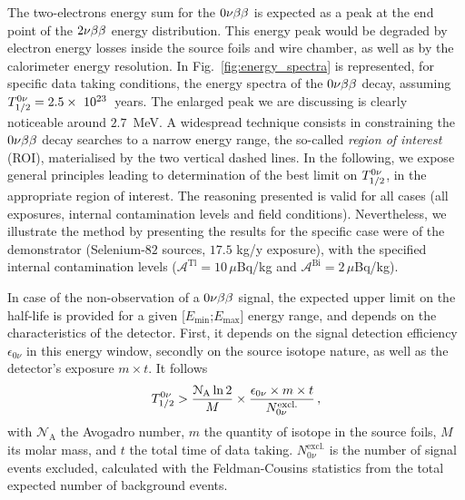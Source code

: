 The two-electrons energy sum for the $0\nu\beta\beta$ is expected as a peak at the end point of the $2\nu\beta\beta$ energy distribution.
This energy peak would be degraded by electron energy losses inside the source foils and wire chamber, as well as by the calorimeter energy resolution.
In Fig.~\ref{fig:energy_spectra} is represented, for specific data taking conditions, the energy spectra of the $0\nu\beta\beta$ decay, assuming $T_{1/2}^{0\nu} = 2.5\times~10^{23}$~years.
The enlarged peak we are discussing is clearly noticeable around $2.7$~MeV. %
A widespread technique consists in constraining the $0\nu\beta\beta$ decay searches to a narrow energy range, the so-called \emph{region of interest} (ROI), materialised by the two vertical dashed lines.
In the following, we expose general principles leading to determination of the best limit on $T_{1/2}^{0\nu}$, in the appropriate region of interest.
The reasoning presented is valid for all cases (all exposures, internal contamination levels and field conditions).
Nevertheless, we illustrate the method by presenting the results for the specific case were of the demonstrator (Selenium-$82$ sources, $17.5$ kg/y exposure), with the specified internal contamination levels ($\mathcal{A}^{\text{Tl}} = 10\,\mu$Bq/kg and $\mathcal{A}^{\text{Bi}} = 2\,\mu$Bq/kg).

In case of the non-observation of a $0\nu\beta\beta$ signal, the expected upper limit on the half-life is provided for a given [$E_{\text{min}}$;$E_{\text{max}}$] energy range, and depends on the characteristics of the detector.
First, it depends on the signal detection efficiency $\epsilon_{0\nu}$ in this energy window, secondly on the source isotope nature, as well as the detector's exposure $m\times t$.
It follows
\begin{equation}
  T_{1/2}^{0\nu} > \frac{\mathcal{N}_{\text{A}}\ln{2}}{M}\times \frac{\epsilon_{0\nu}\times m\times t}{N_{0\nu}^{\text{excl.}}}\,,
  \label{eq:tbeta_limit}
\end{equation}
with $\mathcal{N}_{\text{A}}$ the Avogadro number, $m$ the quantity of isotope in the source foils, $M$ its molar mass, and $t$ the total time of data taking.
$N_{0\nu}^{\text{excl.}}$ is the number of signal events excluded, calculated with the Feldman-Cousins statistics from the total expected number of background events.

